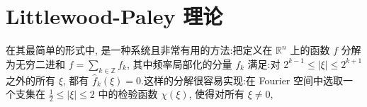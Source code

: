 %
%
%

\section{Littlewood-Paley 理论}

在其最简单的形式中, 是一种系统且非常有用的方法:把定义在 $\mathbb{R}^n$ 上的函数 $f$ 分解为无穷二进和 $f = \sum_{k\in\mathbb{Z}} f_k$, 其中频率局部化的分量 $f_k$ 满足:对 $2^{k-1} \leq |\xi| \leq 2^{k+1}$ 之外的所有 $\xi$, 都有 $\hat{f}_k(\xi) = 0$.这样的分解很容易实现:在 Fourier 空间中选取一个支集在 $\frac{1}{2} \leq |\xi| \leq 2$ 中的检验函数 $\chi(\xi)$, 使得对所有 $\xi \neq 0$,

